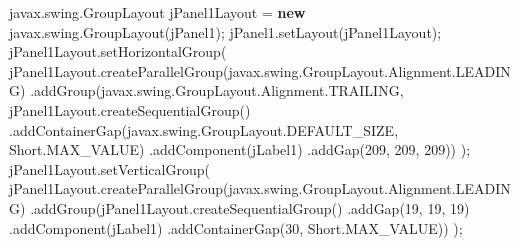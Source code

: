 \documentclass[
  10pt,
]{article}
\newenvironment{Shaded}{}{}
\newcommand{\BuiltInTok}[1]{\textcolor[rgb]{0.00,0.50,0.00}{#1}}
\newcommand{\DecValTok}[1]{\textcolor[rgb]{0.25,0.63,0.44}{#1}}
\newcommand{\FunctionTok}[1]{\textcolor[rgb]{0.02,0.16,0.49}{#1}}
\newcommand{\KeywordTok}[1]{\textcolor[rgb]{0.00,0.44,0.13}{\textbf{#1}}}
\newcommand{\NormalTok}[1]{#1}
\newcommand{\OperatorTok}[1]{\textcolor[rgb]{0.40,0.40,0.40}{#1}}
\begin{document}
\begin{Shaded}
\begin{Highlighting}[numbers=left,,]
\NormalTok{        javax}\OperatorTok{.}\FunctionTok{swing}\OperatorTok{.}\FunctionTok{GroupLayout}\NormalTok{ jPanel1Layout }\OperatorTok{=} \KeywordTok{new}\NormalTok{ javax}\OperatorTok{.}\FunctionTok{swing}\OperatorTok{.}\FunctionTok{GroupLayout}\OperatorTok{(}\NormalTok{jPanel1}\OperatorTok{);}
\NormalTok{        jPanel1}\OperatorTok{.}\FunctionTok{setLayout}\OperatorTok{(}\NormalTok{jPanel1Layout}\OperatorTok{);}
\NormalTok{        jPanel1Layout}\OperatorTok{.}\FunctionTok{setHorizontalGroup}\OperatorTok{(}
\NormalTok{            jPanel1Layout}\OperatorTok{.}\FunctionTok{createParallelGroup}\OperatorTok{(}\NormalTok{javax}\OperatorTok{.}\FunctionTok{swing}\OperatorTok{.}\FunctionTok{GroupLayout}\OperatorTok{.}\FunctionTok{Alignment}\OperatorTok{.}\FunctionTok{LEADING}\OperatorTok{)}
            \OperatorTok{.}\FunctionTok{addGroup}\OperatorTok{(}\NormalTok{javax}\OperatorTok{.}\FunctionTok{swing}\OperatorTok{.}\FunctionTok{GroupLayout}\OperatorTok{.}\FunctionTok{Alignment}\OperatorTok{.}\FunctionTok{TRAILING}\OperatorTok{,}\NormalTok{ jPanel1Layout}\OperatorTok{.}\FunctionTok{createSequentialGroup}\OperatorTok{()}
                \OperatorTok{.}\FunctionTok{addContainerGap}\OperatorTok{(}\NormalTok{javax}\OperatorTok{.}\FunctionTok{swing}\OperatorTok{.}\FunctionTok{GroupLayout}\OperatorTok{.}\FunctionTok{DEFAULT\_SIZE}\OperatorTok{,} \BuiltInTok{Short}\OperatorTok{.}\FunctionTok{MAX\_VALUE}\OperatorTok{)}
                \OperatorTok{.}\FunctionTok{addComponent}\OperatorTok{(}\NormalTok{jLabel1}\OperatorTok{)}
                \OperatorTok{.}\FunctionTok{addGap}\OperatorTok{(}\DecValTok{209}\OperatorTok{,} \DecValTok{209}\OperatorTok{,} \DecValTok{209}\OperatorTok{))}
        \OperatorTok{);}
\NormalTok{        jPanel1Layout}\OperatorTok{.}\FunctionTok{setVerticalGroup}\OperatorTok{(}
\NormalTok{            jPanel1Layout}\OperatorTok{.}\FunctionTok{createParallelGroup}\OperatorTok{(}\NormalTok{javax}\OperatorTok{.}\FunctionTok{swing}\OperatorTok{.}\FunctionTok{GroupLayout}\OperatorTok{.}\FunctionTok{Alignment}\OperatorTok{.}\FunctionTok{LEADING}\OperatorTok{)}
            \OperatorTok{.}\FunctionTok{addGroup}\OperatorTok{(}\NormalTok{jPanel1Layout}\OperatorTok{.}\FunctionTok{createSequentialGroup}\OperatorTok{()}
                \OperatorTok{.}\FunctionTok{addGap}\OperatorTok{(}\DecValTok{19}\OperatorTok{,} \DecValTok{19}\OperatorTok{,} \DecValTok{19}\OperatorTok{)}
                \OperatorTok{.}\FunctionTok{addComponent}\OperatorTok{(}\NormalTok{jLabel1}\OperatorTok{)}
                \OperatorTok{.}\FunctionTok{addContainerGap}\OperatorTok{(}\DecValTok{30}\OperatorTok{,} \BuiltInTok{Short}\OperatorTok{.}\FunctionTok{MAX\_VALUE}\OperatorTok{))}
        \OperatorTok{);}


\end{Highlighting}
\end{Shaded}
\end{document}
